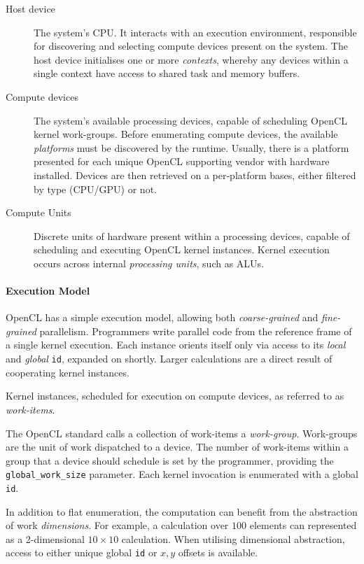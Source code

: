 \begin{description}
\item[Host device] The system's \ac{CPU}. It interacts with an execution environment, responsible for discovering and selecting compute devices present on the system. The host device initialises one or more \emph{contexts}, whereby any devices within a single context have access to shared task and memory buffers.

\item[Compute devices] The system's available processing devices, capable of scheduling \ac{OpenCL} kernel work-groups. Before enumerating compute devices, the available \emph{platforms} must be discovered by the runtime. Usually, there is a platform presented for each unique \ac{OpenCL} supporting vendor with hardware installed. Devices are then retrieved on a per-platform bases, either filtered by type (\ac{CPU}/\ac{GPU}) or not.

\item[Compute Units] Discrete units of hardware present within a processing devices, capable of scheduling and executing \ac{OpenCL} kernel instances.
Kernel execution occurs across internal \emph{processing units}, such as \acp{ALU}.
\end{description}

\paragraph{Execution Model}
\ac{OpenCL} has a simple execution model, allowing both \emph{coarse-grained} and \emph{fine-grained} parallelism. Programmers write parallel code from the reference frame of a single kernel execution. Each instance orients itself only via access to its \emph{local} and \emph{global} \verb|id|, expanded on shortly. Larger calculations are a direct result of cooperating kernel instances. 

Kernel instances, scheduled for execution on compute devices, as referred to as \emph{work-items}.

The \ac{OpenCL} standard calls a collection of work-items a \emph{work-group}. Work-groups are the unit of work dispatched to a device. The number of work-items within a group that a device should schedule is set by the programmer, providing the \verb|global_work_size| parameter. Each kernel invocation is enumerated with a global \verb|id|. 

In addition to flat enumeration, the computation can benefit from the abstraction of work \emph{dimensions}. For example, a calculation over $100$ elements can represented as a 2-dimensional $10 \times 10$ calculation. When utilising dimensional abstraction, access to either unique global \verb|id| or $x, y$ offsets is available.

